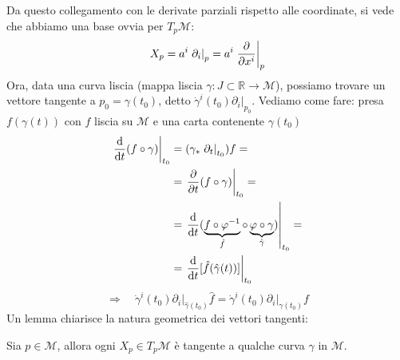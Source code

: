Da questo collegamento con le derivate parziali rispetto alle coordinate, si vede che abbiamo una base ovvia per $T_p\mathcal{M}$:
\begin{equation}
    X_p = a^i \left.\partial_i \right|_{p} = a^i \left.\pdv{}{x^i} \right|_{p}
\end{equation}
Ora, data una curva liscia (mappa liscia $\gamma : J \subset \mathbb{R} \rightarrow \mathcal{M}$), possiamo trovare un vettore tangente a $p_0 = \gamma(t_0)$, detto $\dot \gamma^i(t_0) \left.\partial_i \right|_{p_0}$.
Vediamo come fare: presa $f(\gamma(t))$ con $f$ liscia su $\mathcal{M}$ e una carta contenente $\gamma (t_0)$
\begin{align*}
    \left.\odv{}{t}(f \circ \gamma)\right|_{t_0} & = (\gamma_* \left.\partial_t\right|_{t_0})f=                                                                                       \\
                                                 & = \left.\pdv{}{t}(f \circ \gamma)\right|_{t_0} =                                                                                   \\
                                                 & = \left.\odv{}{t}(\underbrace{f \circ \varphi^{-1}}_{\hat f} \circ \underbrace{\varphi \circ \gamma}_{\hat \gamma})\right|_{t_0} = \\
                                                 & = \left.\odv{}{t}[\hat f (\hat \gamma (t))] \right|_{t_0}
\end{align*}
\begin{equation}
    \Longrightarrow \quad \dot \gamma^i(t_0) \left.\partial_i \right|_{\hat \gamma (t_0)} \hat f = \dot \gamma^i(t_0) \left.\partial_i \right|_{\gamma (t_0)} f
\end{equation}
Un lemma chiarisce la natura geometrica dei vettori tangenti:
\begin{lemma}
    Sia $p \in \mathcal{M}$, allora ogni $X_p \in T_p\mathcal{M}$ è tangente a qualche curva $\gamma$ in $\mathcal{M}$.
\end{lemma}

